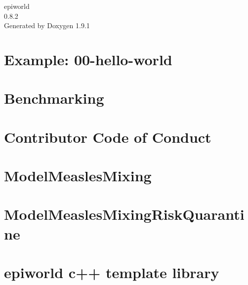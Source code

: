 \let\mypdfximage\pdfximage\def\pdfximage{\immediate\mypdfximage}\documentclass[twoside]{book}
\newcommand{\+}{\discretionary{\mbox{\scriptsize$\hookleftarrow$}}{}{}}
\newcommand{\clearemptydoublepage}{%
  \newpage{\pagestyle{empty}\cleardoublepage}%
}
\begin{document}
\raggedbottom

\hypersetup{pageanchor=false,
             bookmarksnumbered=true,
             pdfencoding=unicode
            }
\begin{titlepage}
\vspace*{7cm}
\begin{center}%
{\Large epiworld \\[1ex]\large 0.\+8.\+2 }\\
\vspace*{1cm}
{\large Generated by Doxygen 1.9.1}\\
\end{center}
\end{titlepage}
\clearemptydoublepage
{}
\tableofcontents
\clearemptydoublepage
{}
\hypersetup{pageanchor=true}

\chapter{Example\+: 00-\/hello-\/world}
\label{index}\hypertarget{index}{}
\chapter{Benchmarking}
\label{md_benchmark__r_e_a_m_e}

\chapter{Contributor Code of Conduct}
\label{md__c_o_d_e__o_f__c_o_n_d_u_c_t}

\chapter{Model\+Measles\+Mixing}
\label{md_docs__model_measles_mixing}

\chapter{Model\+Measles\+Mixing\+Risk\+Quarantine}
\label{md_docs__model_measles_mixing_risk_quarantine}

\chapter{epiworld c++ template library}
\label{md_examples_07_surveillance_07_surveillance}

\end{document}
